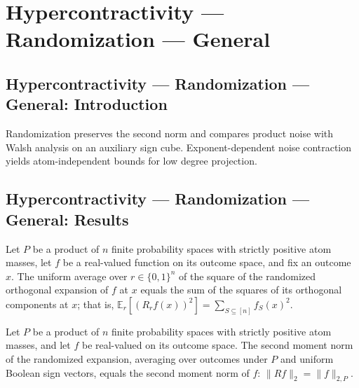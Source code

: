 \section{Hypercontractivity --- Randomization --- General}
\subsection*{Hypercontractivity --- Randomization --- General: Introduction}
Randomization preserves the second norm and compares product noise with Walsh analysis on an auxiliary sign cube. Exponent-dependent noise contraction yields atom-independent bounds for low degree projection.

\subsection*{Hypercontractivity --- Randomization --- General: Results}

\begin{theorem}
\leanok
{}
Let $P$ be a product of $n$ finite probability spaces with strictly positive atom
masses, let $f$ be a real-valued function on its outcome space, and fix an outcome $x$.
The uniform average over $r\in\{0,1\}^n$ of the square of the randomized orthogonal
expansion of $f$ at $x$ equals the sum of the squares of its orthogonal components at
$x$; that is, $\mathbb E_r[(R_rf(x))^2]=\sum_{S\subseteq[n]} f_S(x)^2$.
\end{theorem}

\begin{theorem}
\leanok
{}
Let $P$ be a product of $n$ finite probability spaces with strictly positive atom
masses, and let $f$ be real-valued on its outcome space. The second moment norm of the
randomized expansion, averaging over outcomes under $P$ and uniform Boolean sign
vectors, equals the second moment norm of $f$: $\|Rf\|_{2}=\|f\|_{2,P}$.
\end{theorem}


